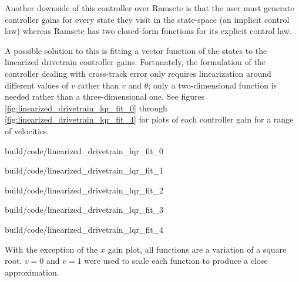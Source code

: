 Another downside of this controller over Ramsete is that the user must generate
controller gains for every state they visit in the state-space (an implicit
control law) whereas Ramsete has two closed-form functions for its explicit
control law.

A possible solution to this is fitting a vector function of the states to the
linearized drivetrain controller gains. Fortunately, the formulation of the
controller dealing with cross-track error only requires linearization around
different values of $v$ rather than $v$ and $\theta$; only a two-dimensional
function is needed rather than a three-dimensional one. See figures
\ref{fig:linearized_drivetrain_lqr_fit_0} through
\ref{fig:linearized_drivetrain_lqr_fit_4} for plots of each controller gain for
a range of velocities.

\begin{bookfigure}
  \begin{minisvg}{build/code/linearized_drivetrain_lqr_fit_0}
    \caption{Linearized drivetrain controller LQR gain regression fit ($x$)}
    \label{fig:linearized_drivetrain_lqr_fit_0}
  \end{minisvg}
  \hfill
  \begin{minisvg}{build/code/linearized_drivetrain_lqr_fit_1}
    \caption{Linearized drivetrain controller LQR gain fit regression fit ($y$)}
    \label{fig:linearized_drivetrain_lqr_fit_1}
  \end{minisvg}
  \hfill
  \begin{minisvg}{build/code/linearized_drivetrain_lqr_fit_2}
    \caption{Linearized drivetrain controller LQR gain regression fit ($\theta$)}
    \label{fig:linearized_drivetrain_lqr_fit_2}
  \end{minisvg}
  \hfill
  \begin{minisvg}{build/code/linearized_drivetrain_lqr_fit_3}
    \caption{Linearized drivetrain controller LQR gain regression fit ($v_l$)}
    \label{fig:linearized_drivetrain_lqr_fit_3}
  \end{minisvg}
  \hfill
  \begin{minisvg}{build/code/linearized_drivetrain_lqr_fit_4}
    \caption{Linearized drivetrain controller LQR gain regression fit ($v_r$)}
    \label{fig:linearized_drivetrain_lqr_fit_4}
  \end{minisvg}
\end{bookfigure}

With the exception of the $x$ gain plot, all functions are a variation of a
square root. $v = 0$ and $v = 1$ were used to scale each function to produce a
close approximation.

